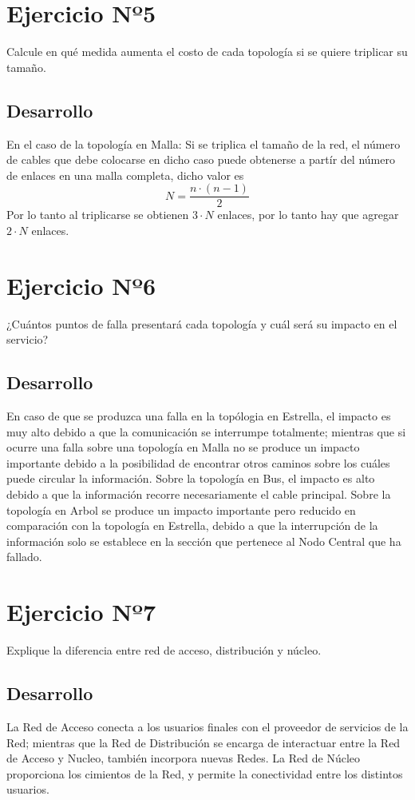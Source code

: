 \documentclass[12pt,letterpaper]{article}
\begin{document}
\section{Ejercicio Nº5}
Calcule en qué medida aumenta el costo de cada topología si se quiere triplicar su tamaño.
\subsection{Desarrollo}
En el caso de la topología en Malla:
Si se triplica el tamaño de la red, el número de cables que debe colocarse en dicho caso puede obtenerse a partír del número de enlaces en una malla completa, dicho valor es
\begin{equation}
N=\frac{n \cdot (n-1)}{2}
\end{equation}
Por lo tanto al triplicarse se obtienen $3 \cdot N$ enlaces, por lo tanto hay que agregar $2 \cdot N$ enlaces.
\section{Ejercicio Nº6}
¿Cuántos puntos de falla presentará cada topología y cuál será su impacto en el servicio?
\subsection{Desarrollo}
En caso de que se produzca una falla en la topólogia en Estrella, el impacto es muy alto debido a que la comunicación se interrumpe totalmente; mientras que si ocurre una falla sobre una topología en Malla no se produce un impacto importante debido a la posibilidad de encontrar otros caminos sobre los cuáles puede circular la información.
Sobre la topología en Bus, el impacto es alto debido a que la información recorre necesariamente el cable principal. Sobre la topología en Arbol se produce un impacto importante pero reducido en comparación con la topología en Estrella, debido a que la interrupción de la información solo se establece en la sección que pertenece al Nodo Central que ha fallado.
\section{Ejercicio Nº7}
Explique la diferencia entre red de acceso, distribución y núcleo.
\subsection{Desarrollo}
La Red de Acceso conecta a los usuarios finales con el proveedor de servicios de la Red; mientras que la Red de Distribución se encarga de interactuar entre la Red de Acceso y Nucleo, también incorpora nuevas Redes.
La Red de Núcleo proporciona los cimientos de la Red, y permite la conectividad entre los distintos usuarios.
\end{document}
